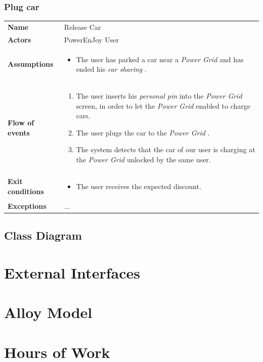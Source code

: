 \documentclass[english]{article}
\newcommand{\carsharing}{\textit {car sharing }}
\newcommand{\powergrid}{\textit{Power Grid }}
\newcommand{\personalpin}{\textit{personal pin }}
\begin{document}
\subsubsection{Plug car}
	\begin{center}
	\begin{tabular}{l||p{10cm}}
	\textbf{Name} 
		& Release Car\\ [8px]
	\textbf{Actors} 
		& PowerEnJoy User\\ [8px]
	\textbf{Assumptions} 
	& \begin{itemize}
		\item The user has parked a car near a \powergrid and has ended his \carsharing. 
	\end{itemize}\\
	\textbf{Flow of events}
		& \begin{enumerate}
 			\item The user inserts his \personalpin into the \powergrid screen, in order to let the \powergrid enabled to charge cars.
			\item The user plugs the car to the \powergrid.
			\item The system detects that the car of our user is charging at the \powergrid unlocked by the same user. 
		\end{enumerate}\\ 
	\textbf{Exit conditions}
		&\begin{itemize}
			\item The user receives the expected discount.
		\end{itemize}\\
	\textbf{Exceptions}
		&...\\[8px]
	\end{tabular}
	\end{center}

	\subsection{Class Diagram}
\section{External Interfaces}
\section{Alloy Model}
\section{Hours of Work}
\end{document}
